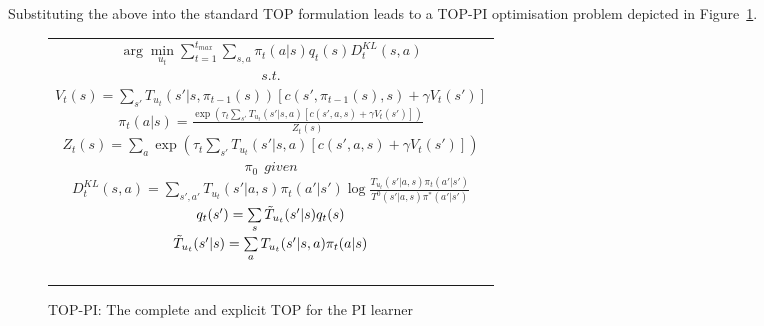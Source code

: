 Substituting the above into the standard
TOP formulation leads to a TOP-PI optimisation problem depicted in
Figure~\ref{t_opt_PI}.
\begin{figure}[th]
\begin{tabular}{|c|} \hline \parbox{3.2 in} {\center 
$\arg\min\limits_{u_t}\sum\limits_{t=1}^{t_{max}}\sum\limits_{s,a}\pi_t(a|s)q_t(s)D^{KL}_t(s,a)$\\
$s.t.$\\
$V_t(s)=\sum\limits_{s'}T_{u_t}(s'|s,\pi_{t-1}(s))\left[
c(s',\pi_{t-1}(s),s)+\gamma V_t(s')
\right]$\\
$\pi_t(a|s)=\frac{\exp\left(\tau_t\sum\limits_{s'}T_{u_t}(s'|s,a)\left[
c(s',a,s)+\gamma V_t(s')
\right]\right)}{Z_t(s)}$\\
$Z_t(s)=\sum\limits_a\exp\left(\tau_t\sum\limits_{s'}T_{u_t}(s'|s,a)\left[
c(s',a,s)+\gamma V_t(s')
\right]\right)$\\
$\pi_0\ \ \displaystyle{given}$\\
$D^{KL}_t(s,a)=\sum\limits_{s',a'}T_{u_t}(s'|a,s)\pi_t(a'|s')\log\frac{T_{u_t}(s'|a,s)\pi_t(a'|s')}{T^0(s'|a,s)\pi^*(a'|s')}$\\
$q_t(s')=\sum\limits_s\Tilde{T}_{u_t}(s'|s)q_t(s)$\\
$\Tilde{T}_{u_t}(s'|s)=\sum\limits_aT_{u_t}(s'|s,a)\pi_t(a|s)$\\\ \\
}\\ \hline \end{tabular}
\caption{\label{t_opt_PI}TOP-PI: The complete and explicit TOP for the
  PI learner}
\end{figure}
